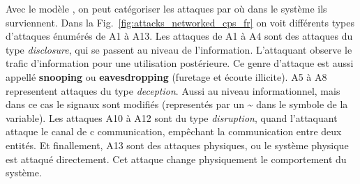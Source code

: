 \documentclass[../main.tex]{subfiles}
\begin{document}
Avec le modèle \DDD{}, on peut catégoriser les attaques par où dans le système ils surviennent.
Dans la Fig.~\ref{fig:attacks_networked_cps_fr} on voit différents types d'attaques énumérés de A1 à A13.
Les attaques de A1 à A4 sont des attaques du type \emph{disclosure}, qui se passent au niveau de l'information.
L'attaquant observe le trafic d'information pour une utilisation postérieure.
Ce genre d'attaque est aussi appellé \textbf{snooping} ou \textbf{eavesdropping} (furetage et écoute illicite).
A5 à A8 representent attaques du type \emph{deception}.
Aussi au niveau informationnel, mais dans ce cas le signaux sont modifiés (representés par un \~{} dans le symbole de la variable).
Les attaques A10 à A12 sont du type \emph{disruption}, quand l'attaquant attaque le canal de c communication, empêchant la communication entre deux entités.
Et finallement, A13 sont des attaques physiques, ou le système physique est attaqué directement.
Cet attaque change physiquement le comportement du système.
\end{document}
